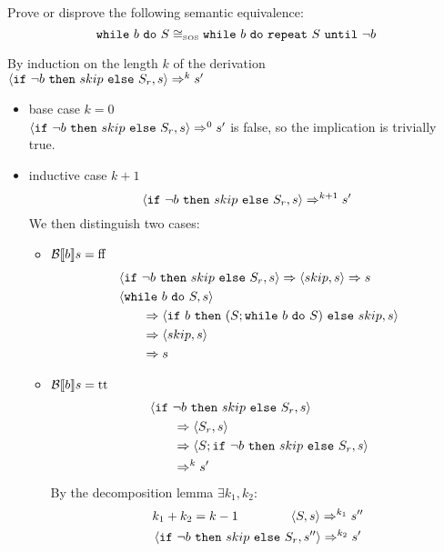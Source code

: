 \begin{exercise}{
    Prove or disprove the following semantic equivalence:
    \[ \texttt{while}\ b\ \texttt{do}\ S \cong_{\text{\tiny SOS}} \texttt{while}\ b\ \texttt{do}\ \texttt{repeat}\ S\ \texttt{until}\ \neg b  \]\vspace*{-0.6cm}
}
\begin{itemize}
            By induction on the length $k$ of the derivation $\left<\texttt{if}\ \neg b\ \texttt{then}\ skip\ \texttt{else}\ S_r, s\right> \Rightarrow^k s'$
            \begin{itemize}
                \item base case $k=0$ \\
                $\left<\texttt{if}\ \neg b\ \texttt{then}\ skip\ \texttt{else}\ S_r, s\right> \Rightarrow^0 s'$ is false, so the implication is trivially true.
                \item inductive case $k+1$ \vspace*{-0.3cm}
                \[ \left<\texttt{if}\ \neg b\ \texttt{then}\ skip\ \texttt{else}\ S_r, s\right> \Rightarrow^{k+1} s' \]
                We then distinguish two cases:
                \begin{itemize}
                    \item $\mathcal{B} \llbracket b \rrbracket s = \text{ff}$
                    \begin{align*}
                        &\left<\texttt{if}\ \neg b\ \texttt{then}\ skip\ \texttt{else}\ S_r, s\right>
                        \Rightarrow
                        \left<skip, s\right>
                        \Rightarrow s
                        \\
                        &\left<\texttt{while}\ b\ \texttt{do}\ S, s\right>
                        \\&\qquad\Rightarrow \left<\texttt{if}\ b\ \texttt{then}\ (S; \texttt{while}\ b\ \texttt{do}\ S)\ \texttt{else}\ skip, s\right>
                        \\&\qquad\Rightarrow \left<skip, s\right>
                        \\&\qquad\Rightarrow s
                    \end{align*}
                    \item $\mathcal{B} \llbracket b \rrbracket s = \text{tt}$
                    \begin{align*}
                        &\left<\texttt{if}\ \neg b\ \texttt{then}\ skip\ \texttt{else}\ S_r, s\right>
                        \\&\qquad\Rightarrow \left<S_r, s\right>
                        \\&\qquad\Rightarrow \left<S; \texttt{if}\ \neg b\ \texttt{then}\ skip\ \texttt{else}\ S_r, s\right>
                        \\&\qquad\Rightarrow^k s'
                    \end{align*}
                    By the decomposition lemma $\exists k_1, k_2 :$
                    \begin{gather*}
                        k_1 + k_2 = k - 1 \qquad\qquad
                        \instr{S}{s} \Rightarrow^{k_1} s'' \\
                        \instr{\wif{\neg b}{skip}{S_r}}{s''} \Rightarrow^{k_2} s'

\end{gather*}
\end{itemize}
\end{itemize}
\end{itemize}
\end{exercise}

